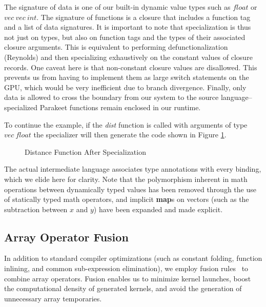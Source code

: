 \documentclass[preprint]{sigplanconf}
\begin{document}
The signature of data is one of our
built-in dynamic value types such as $float$ or $vec~vec~int$.  The signature of
functions is a closure that includes a function tag and a list of data
signatures.  It is important to note that specialization is thus not just on
types, but also on function tags and the types of their associated closure
arguments. This is equivalent to performing defunctionalization (Reynolds) and
then specializing exhaustively on the constant values of closure records. One
caveat here is that non-constant closure values are disallowed.  This prevents
us from having to implement them as large switch statements on the GPU, which
would be very inefficient due to branch divergence.  Finally, only data is
allowed to cross the boundary from our system to the source
language--specialized Parakeet functions remain enclosed in our runtime.

To continue the example, if the \textit{dist} function is called with arguments
of type $vec~ float$ the specializer will then generate the code shown in Figure
\ref{SpecDist}.

\begin{figure}[h!]
\caption{Distance Function After Specialization}
\label{SpecDist}
\end{figure}

The actual intermediate language associates type annotations with every binding,
which we elide here for clarity. Note that the polymorphism inherent in math
operations between dynamically typed values has been removed through the use of
statically typed math operators, and implicit \textbf{map}s on vectors (such
as the subtraction between $x$ and $y$) have been expanded and made explicit.


\subsection{Array Operator Fusion}
In addition to standard compiler optimizations (such as constant folding,
function inlining, and common sub-expression elimination), we employ fusion
rules~\cite{Jones01} to combine array operators. Fusion enables us to minimize
kernel launches, boost the computational density of generated kernels, and
avoid the generation of unnecessary array temporaries.
\end{document}
